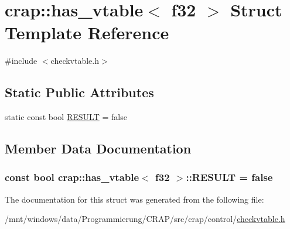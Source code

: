 \hypertarget{structcrap_1_1has__vtable_3_01f32_01_4}{\section{crap\-:\-:has\-\_\-vtable$<$ f32 $>$ Struct Template Reference}
\label{structcrap_1_1has__vtable_3_01f32_01_4}
}


{\ttfamily \#include $<$checkvtable.\-h$>$}

\subsection*{Static Public Attributes}
\begin{DoxyCompactItemize}
\item 
static const bool \hyperlink{structcrap_1_1has__vtable_3_01f32_01_4_a2bef57fccaf90e998c4c6eefae20c455}{R\-E\-S\-U\-L\-T} = false
\end{DoxyCompactItemize}


\subsection{Member Data Documentation}
\hypertarget{structcrap_1_1has__vtable_3_01f32_01_4_a2bef57fccaf90e998c4c6eefae20c455}{
\subsubsection[{R\-E\-S\-U\-L\-T}]{\setlength{\rightskip}{0pt plus 5cm}const bool {\bf crap\-::has\-\_\-vtable}$<$ {\bf f32} $>$\-::R\-E\-S\-U\-L\-T = false\hspace{0.3cm}{\ttfamily [static]}}}\label{structcrap_1_1has__vtable_3_01f32_01_4_a2bef57fccaf90e998c4c6eefae20c455}


The documentation for this struct was generated from the following file\-:\begin{DoxyCompactItemize}
\item 
/mnt/windows/data/\-Programmierung/\-C\-R\-A\-P/src/crap/control/\hyperlink{checkvtable_8h}{checkvtable.\-h}\end{DoxyCompactItemize}
